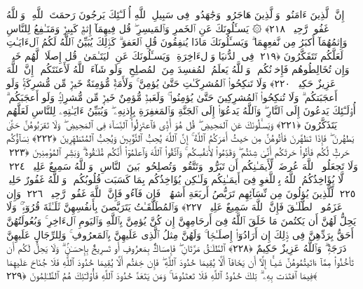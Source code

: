  إِنَّ ٱلَّذِينَ ءَامَنُوا۟ وَٱلَّذِينَ هَاجَرُوا۟ وَجَٰهَدُوا۟ فِى سَبِيلِ ٱللَّهِ أُو۟لَـٰٓئِكَ يَرجُونَ رَحمَتَ ٱللَّهِ ۚ وَٱللَّهُ غَفُورٌۭ رَّحِيمٌۭ ﴿٢١٨﴾
 ۞ يَسـَٔلُونَكَ عَنِ ٱلخَمرِ وَٱلمَيسِرِ ۖ قُل فِيهِمَآ إِثمٌۭ كَبِيرٌۭ وَمَنَـٰفِعُ لِلنَّاسِ وَإِثمُهُمَآ أَكبَرُ مِن نَّفعِهِمَا ۗ وَيَسـَٔلُونَكَ مَاذَا يُنفِقُونَ قُلِ ٱلعَفوَ ۗ كَذَٟلِكَ يُبَيِّنُ ٱللَّهُ لَكُمُ ٱلءَايَـٰتِ لَعَلَّكُم تَتَفَكَّرُونَ ﴿٢١٩﴾
 فِى ٱلدُّنيَا وَٱلءَاخِرَةِ ۗ وَيَسـَٔلُونَكَ عَنِ ٱليَتَـٰمَىٰ ۖ قُل إِصلَاحٌۭ لَّهُم خَيرٌۭ ۖ وَإِن تُخَالِطُوهُم فَإِخوَٟنُكُم ۚ وَٱللَّهُ يَعلَمُ ٱلمُفسِدَ مِنَ ٱلمُصلِحِ ۚ وَلَو شَآءَ ٱللَّهُ لَأَعنَتَكُم ۚ إِنَّ ٱللَّهَ عَزِيزٌ حَكِيمٌۭ ﴿٢٢٠﴾
 وَلَا تَنكِحُوا۟ ٱلمُشرِكَـٰتِ حَتَّىٰ يُؤمِنَّ ۚ وَلَأَمَةٌۭ مُّؤمِنَةٌ خَيرٌۭ مِّن مُّشرِكَةٍۢ وَلَو أَعجَبَتكُم ۗ وَلَا تُنكِحُوا۟ ٱلمُشرِكِينَ حَتَّىٰ يُؤمِنُوا۟ ۚ وَلَعَبدٌۭ مُّؤمِنٌ خَيرٌۭ مِّن مُّشرِكٍۢ وَلَو أَعجَبَكُم ۗ أُو۟لَـٰٓئِكَ يَدعُونَ إِلَى ٱلنَّارِ ۖ وَٱللَّهُ يَدعُوٓا۟ إِلَى ٱلجَنَّةِ وَٱلمَغفِرَةِ بِإِذنِهِۦ ۖ وَيُبَيِّنُ ءَايَـٰتِهِۦ لِلنَّاسِ لَعَلَّهُم يَتَذَكَّرُونَ ﴿٢٢١﴾
 وَيَسـَٔلُونَكَ عَنِ ٱلمَحِيضِ ۖ قُل هُوَ أَذًۭى فَٱعتَزِلُوا۟ ٱلنِّسَآءَ فِى ٱلمَحِيضِ ۖ وَلَا تَقرَبُوهُنَّ حَتَّىٰ يَطهُرنَ ۖ فَإِذَا تَطَهَّرنَ فَأتُوهُنَّ مِن حَيثُ أَمَرَكُمُ ٱللَّهُ ۚ إِنَّ ٱللَّهَ يُحِبُّ ٱلتَّوَّٰبِينَ وَيُحِبُّ ٱلمُتَطَهِّرِينَ ﴿٢٢٢﴾
 نِسَآؤُكُم حَرثٌۭ لَّكُم فَأتُوا۟ حَرثَكُم أَنَّىٰ شِئتُم ۖ وَقَدِّمُوا۟ لِأَنفُسِكُم ۚ وَٱتَّقُوا۟ ٱللَّهَ وَٱعلَمُوٓا۟ أَنَّكُم مُّلَـٰقُوهُ ۗ وَبَشِّرِ ٱلمُؤمِنِينَ ﴿٢٢٣﴾
 وَلَا تَجعَلُوا۟ ٱللَّهَ عُرضَةًۭ لِّأَيمَـٰنِكُم أَن تَبَرُّوا۟ وَتَتَّقُوا۟ وَتُصلِحُوا۟ بَينَ ٱلنَّاسِ ۗ وَٱللَّهُ سَمِيعٌ عَلِيمٌۭ ﴿٢٢٤﴾
 لَّا يُؤَاخِذُكُمُ ٱللَّهُ بِٱللَّغوِ فِىٓ أَيمَـٰنِكُم وَلَـٰكِن يُؤَاخِذُكُم بِمَا كَسَبَت قُلُوبُكُم ۗ وَٱللَّهُ غَفُورٌ حَلِيمٌۭ ﴿٢٢٥﴾
 لِّلَّذِينَ يُؤلُونَ مِن نِّسَآئِهِم تَرَبُّصُ أَربَعَةِ أَشهُرٍۢ ۖ فَإِن فَآءُو فَإِنَّ ٱللَّهَ غَفُورٌۭ رَّحِيمٌۭ ﴿٢٢٦﴾
 وَإِن عَزَمُوا۟ ٱلطَّلَـٰقَ فَإِنَّ ٱللَّهَ سَمِيعٌ عَلِيمٌۭ ﴿٢٢٧﴾
 وَٱلمُطَلَّقَـٰتُ يَتَرَبَّصنَ بِأَنفُسِهِنَّ ثَلَـٰثَةَ قُرُوٓءٍۢ ۚ وَلَا يَحِلُّ لَهُنَّ أَن يَكتُمنَ مَا خَلَقَ ٱللَّهُ فِىٓ أَرحَامِهِنَّ إِن كُنَّ يُؤمِنَّ بِٱللَّهِ وَٱليَومِ ٱلءَاخِرِ ۚ وَبُعُولَتُهُنَّ أَحَقُّ بِرَدِّهِنَّ فِى ذَٟلِكَ إِن أَرَادُوٓا۟ إِصلَـٰحًۭا ۚ وَلَهُنَّ مِثلُ ٱلَّذِى عَلَيهِنَّ بِٱلمَعرُوفِ ۚ وَلِلرِّجَالِ عَلَيهِنَّ دَرَجَةٌۭ ۗ وَٱللَّهُ عَزِيزٌ حَكِيمٌ ﴿٢٢٨﴾
 ٱلطَّلَـٰقُ مَرَّتَانِ ۖ فَإِمسَاكٌۢ بِمَعرُوفٍ أَو تَسرِيحٌۢ بِإِحسَـٰنٍۢ ۗ وَلَا يَحِلُّ لَكُم أَن تَأخُذُوا۟ مِمَّآ ءَاتَيتُمُوهُنَّ شَيـًٔا إِلَّآ أَن يَخَافَآ أَلَّا يُقِيمَا حُدُودَ ٱللَّهِ ۖ فَإِن خِفتُم أَلَّا يُقِيمَا حُدُودَ ٱللَّهِ فَلَا جُنَاحَ عَلَيهِمَا فِيمَا ٱفتَدَت بِهِۦ ۗ تِلكَ حُدُودُ ٱللَّهِ فَلَا تَعتَدُوهَا ۚ وَمَن يَتَعَدَّ حُدُودَ ٱللَّهِ فَأُو۟لَـٰٓئِكَ هُمُ ٱلظَّـٰلِمُونَ ﴿٢٢٩﴾
